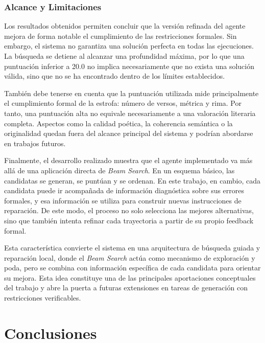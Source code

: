 \documentclass[12pt,a4paper,twoside,openright]{book}
\begin{document}
\subsection{Alcance y Limitaciones}

Los resultados obtenidos permiten concluir que la versión refinada del agente mejora de forma notable el cumplimiento de las restricciones formales. Sin embargo, el sistema no garantiza una solución perfecta en todas las ejecuciones.
La búsqueda se detiene al alcanzar una profundidad máxima, por lo que una puntuación inferior a 20.0 no implica necesariamente que no exista una solución válida, sino que no se ha encontrado dentro de los límites establecidos.

También debe tenerse en cuenta que la puntuación utilizada mide principalmente el cumplimiento formal de la estrofa: número de versos, métrica y rima. Por tanto, una puntuación alta no equivale necesariamente a una valoración literaria completa.
Aspectos como la calidad poética, la coherencia semántica o la originalidad quedan fuera del alcance principal del sistema y podrían abordarse en trabajos futuros.

Finalmente, el desarrollo realizado muestra que el agente implementado va más allá de una aplicación directa de \emph{Beam Search}. En un esquema básico, las candidatas se generan, se puntúan y se ordenan.
En este trabajo, en cambio, cada candidata puede ir acompañada de información diagnóstica sobre sus errores formales, y esa información se utiliza para construir nuevas instrucciones de reparación.
De este modo, el proceso no solo selecciona las mejores alternativas, sino que también intenta refinar cada trayectoria a partir de su propio feedback formal.

Esta característica convierte el sistema en una arquitectura de búsqueda guiada y reparación local, donde el \emph{Beam Search} actúa como mecanismo de exploración y poda, pero se combina con información específica de cada candidata para orientar su mejora.
Esta idea constituye una de las principales aportaciones conceptuales del trabajo y abre la puerta a futuras extensiones en tareas de generación con restricciones verificables.





\chapter{Conclusiones}
\end{document}
